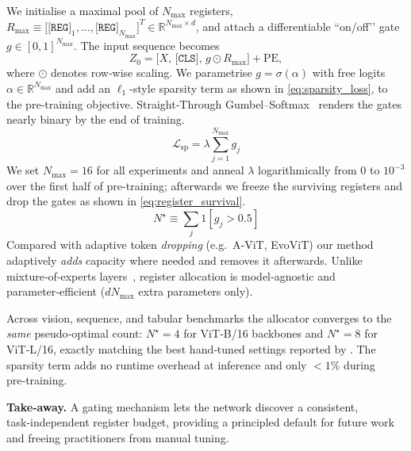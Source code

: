 \documentclass{article}
\newcommand{\RegTok}{\texttt{[REG]}\xspace}
\newcommand{\nreg}{N}
\newcommand{\citet}{\textcite}
\newcommand{\citep}{\parencite}
\begin{document}
We initialise a maximal pool of $\nreg_{\max}$ registers, $R_{\max}\equiv\bigl[\RegTok_1,\ldots,\RegTok_{\nreg_{\max}}\bigr]^T\!\in\!\mathbb R^{\nreg_{\max}\times d}$, and attach a differentiable “on/off’’ gate $g\in[0,1]^{\nreg_{\max}}$.
The input sequence becomes
\begin{equation}
Z_0=\bigl[X,\, \texttt{[CLS]},\, g\odot R_{\max}\bigr]+\text{PE},
\end{equation}
where $\odot$ denotes row‑wise scaling.
We parametrise $g\!=\!\sigma(\alpha)$ with free logits $\alpha\!\in\!\mathbb R^{\nreg_{\max}}$ and add an $\ell_1$-style sparsity term as shown in \cref{eq:sparsity_loss}, to the pre‑training objective.  
Straight‑Through Gumbel–Softmax~\citep{jangCategoricalReparameterizationGumbelsoftmax2017} renders the gates nearly binary by the end of training.
\begin{equation}
\label{eq:sparsity_loss}
\mathcal L_{\text{sp}}=\lambda\sum_{j=1}^{\nreg_{\max}} g_j
\end{equation}
We set $\nreg_{\max}=16$ for all experiments and anneal $\lambda$ logarithmically from $0$ to $10^{-3}$ over the first half of pre-training;
afterwards we freeze the surviving registers and drop the gates as shown in \cref{eq:register_survival}.
\begin{equation}
\label{eq:register_survival}
\nreg^\star\equiv\sum_j\!1[g_j>0.5]
\end{equation}
Compared with adaptive token \emph{dropping} (e.g.\ A‑ViT, EvoViT) our method adaptively \emph{adds} capacity where needed and removes it afterwards.  
Unlike mixture‑of‑experts layers \citep{wangDeepMixtureExperts2019}, register allocation is model‑agnostic and parameter‑efficient ($d\nreg_{\max}$ extra parameters only).

Across vision, sequence, and tabular benchmarks the allocator converges to the \emph{same} pseudo‑optimal count:
$\nreg^\star=4$ for ViT‑B/16 backbones and $\nreg^\star=8$ for ViT‑L/16, exactly matching the best hand‑tuned settings reported by \citet{darcetVisionTransformersNeed2024}.  
The sparsity term adds no runtime overhead at inference and only $<\!1\%$ during pre‑training.

\textbf{Take‑away.}
A gating mechanism lets the network discover a consistent, task‑independent register budget, providing a principled default for future work and freeing practitioners from manual tuning.



\end{document}
